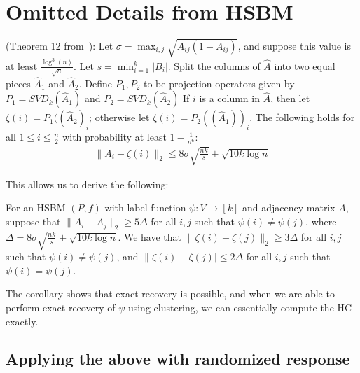 \iffalse
\section{Omitted Details from HSBM}

\iffalse 
\begin{thm}\label{chap5-thm:SBM-recovery}
(Theorem 12 from~\cite{mcsherry2001spectral}): Let $\sigma = \max_{i,j} \sqrt{A_{ij}(1-A_{ij})}$, and suppose this value is at least $\frac{\log^3(n)}{\sqrt{n}}$. Let $s = \min_{i=1}^k |B_i|$. Split the columns of $\hat{A}$ into two equal pieces $\hat{A}_1$ and $\hat{A}_2$. Define $P_1, P_2$ to be projection operators given by $P_1 = SVD_k(\hat{A}_1)$ and $P_2 = SVD_k(\hat{A}_2)$ If $i$ is a column in $\hat{A}$, then let $\zeta(i) = P_1((\hat{A}_2)_i$; otherwise let $\zeta(i) = P_2((\hat{A}_1))_i$. The following holds for all $1 \leq i \leq \frac{n}{2}$ with probability at least $1-\frac{1}{n^6}$:
\begin{align*}
    \|A_i - \zeta(i)\|_2 \leq 8 \sigma \sqrt{\tfrac{nk}{s}} + \sqrt{10k \log n}
\end{align*}
\end{thm}


This allows us to derive the following:

\begin{coro}
    For an HSBM $(P,f)$ with label function $\psi : V \rightarrow [k]$ and adjacency matrix $A$, suppose that $\|A_i - A_j\|_2 \geq 5\Delta$ for all $i,j$ such that $\psi(i) \neq \psi(j)$, where $\Delta = 8 \sigma \sqrt{\tfrac{nk}{s}} + \sqrt{10k \log n}$. We have that $\|\zeta(i) - \zeta(j)\|_2 \geq 3\Delta$ for all $i,j$ such that $\psi(i) \neq \psi(j)$, and $\|\zeta(i) - \zeta(j)| \leq 2\Delta$ for all $i,j$ such that $\psi(i) = \psi(j)$.
\end{coro}

The corollary shows that exact recovery is possible, and when we are able to perform exact recovery of $\psi$ using clustering, we can essentially compute the HC exactly. 


\subsection{Applying the above with randomized response}

